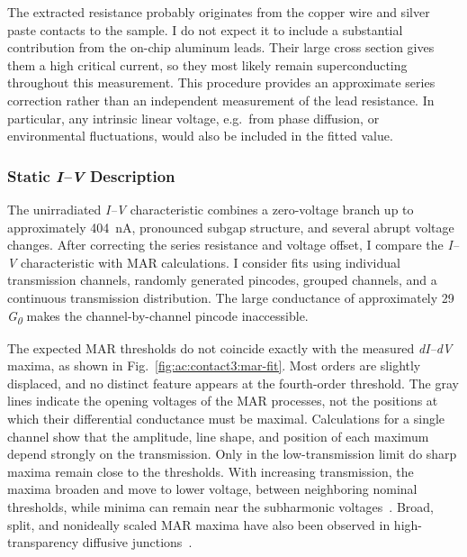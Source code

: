         The extracted resistance probably originates from the copper wire and silver paste contacts to the sample. I do not expect it to include a substantial contribution from the on-chip aluminum leads. Their large cross section gives them a high critical current, so they most likely remain superconducting throughout this measurement. This procedure provides an approximate series correction rather than an independent measurement of the lead resistance. In particular, any intrinsic linear voltage, e.g.~from phase diffusion, or environmental fluctuations, would also be included in the fitted value.

    \subsubsection*{Static \textit{I--V} Description}

        The unirradiated \textit{I--V} characteristic combines a zero-voltage branch up to approximately \qty{404}{\nano\ampere}, pronounced subgap structure, and several abrupt voltage changes. After correcting the series resistance and voltage offset, I compare the \textit{I--V} characteristic with MAR calculations. I consider fits using individual transmission channels, randomly generated pincodes, grouped channels, and a continuous transmission distribution. The large conductance of approximately 29\,\textit{G\textsubscript{0}} makes the channel-by-channel pincode inaccessible.

        The expected MAR thresholds do not coincide exactly with the measured \textit{dI--dV} maxima, as shown in Fig.~\ref{fig:ac:contact3:mar-fit}. Most orders are slightly displaced, and no distinct feature appears at the fourth-order threshold. The gray lines indicate the opening voltages of the MAR processes, not the positions at which their differential conductance must be maximal. Calculations for a single channel show that the amplitude, line shape, and position of each maximum depend strongly on the transmission. Only in the low-transmission limit do sharp maxima remain close to the thresholds. With increasing transmission, the maxima broaden and move to lower voltage, between neighboring nominal thresholds, while minima can remain near the subharmonic voltages~\cite{scheer_conduction-channels_2000}. Broad, split, and nonideally scaled MAR maxima have also been observed in high-transparency diffusive junctions~\cite{hoss_multiple_2000}.

